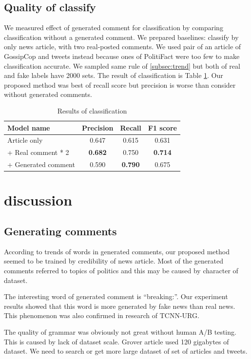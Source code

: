 \documentclass[conference]{IEEEtran}
\begin{document}
\subsection{Quality of classify}
We measured effect of generated comment for classification by comparing classification without a generated comment.
We prepared baselines: classify by only news article, with two real-posted comments.
We used pair of an article of GossipCop and tweets instead because ones of PolitiFact were too few to make classification accurate.
We sampled same rule of \ref{subsec:trend} but both of real and fake labels have 2000 sets.
The result of classification is Table \ref{tbl:classify_results}.
Our proposed method was best of recall score but precision is worse than consider without generated comments.
\begin{table}[!t]
    \renewcommand{\arraystretch}{1.3}
    \caption{Results of classification}
    \label{tbl:classify_results}
    \centering
    \begin{tabular}{lccc}
    \hline
    Model name           & Precision & Recall & F1 score \\ \hline
    Article only         & 0.647     & 0.615  & 0.631    \\
     + Real comment * 2  & \textbf{0.682}     & 0.750  & \textbf{0.714}    \\
     + Generated comment & 0.590     & \textbf{0.790}  & 0.675    \\ \hline
    \end{tabular}
    \end{table}
\section{discussion}
\subsection{Generating comments}
According to trends of words in generated comments, our proposed method seemed to be trained by credibility of news article.
Most of the generated comments referred to topics of politics and this may be caused by character of dataset.

The interesting word of generated comment is ``breaking:''.
Our experiment results showed that this word is more generated by fake news than real news.
This phenomenon was also confirmed in research of TCNN-URG\cite{ijcai2018-533}.

The quality of grammar was obviously not great without human A/B testing.
This is caused by lack of dataset scale. 
Grover article used 120 gigabytes of dataset\cite{NIPS2019_9106}.
We need to search or get more large dataset of set of articles and tweets.
\end{document}
